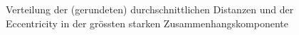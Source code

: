 \begin{figure}[th!]
  \centering
  \caption{Verteilung der (gerundeten) durchschnittlichen Distanzen 
     und der Eccentricity
     in der gr\"ossten starken Zusammenhangskomponente}
  \label{fig:pathlen-dist}
\end{figure}

